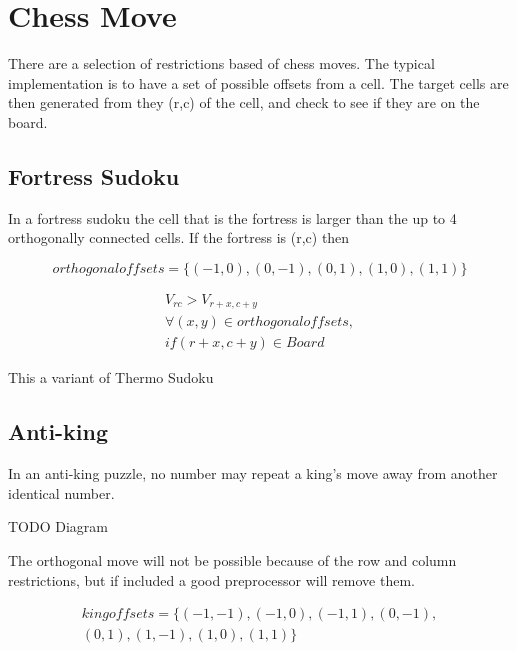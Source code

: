\documentclass{article}
\begin{document}
\section{Chess Move}

There are a selection of restrictions based of chess moves. The typical implementation is to have a set of possible offsets from a cell. The
target cells are then generated from they (r,c) of the cell, and check to see if they are on the board. 


\subsection{Fortress Sudoku}

In a fortress sudoku the cell that is the fortress is larger than the up to 4 orthogonally connected cells. If the fortress is (r,c) then

\begin{equation}
orthogonaloffsets = \lbrace  (-1,0), (0,-1), (0, 1),  (1,0), (1,1) \rbrace
\end{equation}

\begin{equation}
\begin{split}
V_{rc} > V_{r+x,c+y} \\ 
\forall (x,y) \in orthogonaloffsets, \\ 
 if (r+x, c+y) \in Board
\end{split}
\end{equation}

This a variant of Thermo Sudoku


\subsection{Anti-king}

In an anti-king puzzle, no number may repeat a king's move away from another identical number.

TODO Diagram

The orthogonal move will not be possible because of the row and column restrictions, but if included
a good preprocessor will remove them.

\begin{equation}
\begin{split}
kingoffsets = \lbrace (-1,-1), (-1,0), (-1, 1), (0,-1), \\
 (0, 1), (1,-1), (1,0), (1,1) \rbrace
\end{split}
\end{equation}
\end{document}
